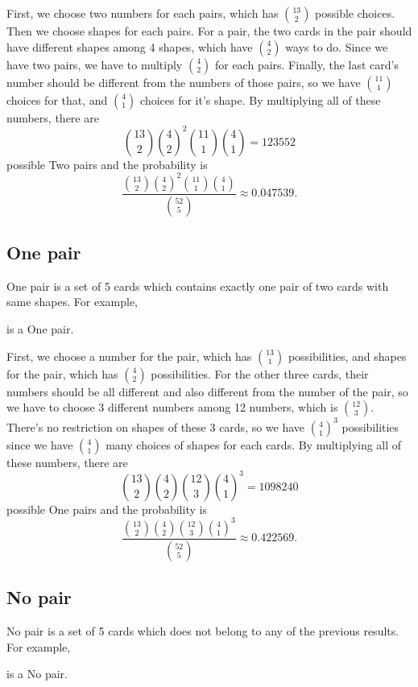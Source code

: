 \documentclass{article}
\begin{document}
First, we choose two numbers for each pairs, which has $\binom{13}{2}$ possible choices. 
Then we choose shapes for each pairs. For a pair, the two cards in the pair should have different shapes among 4 shapes, which have $\binom{4}{2}$ ways to do. Since we have two pairs, we have to multiply $\binom{4}{2}$ for each pairs. 
Finally, the last card's number should be different from the numbers of those pairs, so we have $\binom{11}{1}$ choices for that, and $\binom{4}{1}$ choices for it's shape. 
By multiplying all of these numbers, there are
$$
\binom{13}{2}\binom{4}{2}^{2}\binom{11}{1}\binom{4}{1} = 123552
$$
possible Two pairs and the probability is 
$$
\frac{\binom{13}{2}\binom{4}{2}^{2}\binom{11}{1}\binom{4}{1} }{\binom{52}{5}} \approx 0.047539. 
$$



\subsection*{One pair}
One pair is a set of 5 cards which contains exactly one pair of two cards with same shapes. 
For example, 
\begin{center}
{ \Jh{} \Jd{} \Ah{} \tres{} \fourc{} }
\end{center}
is a One pair. 

First, we choose a number for the pair, which has $\binom{13}{1}$ possibilities, and shapes for the pair, which has $\binom{4}{2}$ possibilities. 
For the other three cards, their numbers should be all different and also different from the number of the pair, so we have to choose 3 different numbers among 12 numbers, which is $\binom{12}{3}$. 
There's no restriction on shapes of these 3 cards, so we have $\binom{4}{1}^{3}$ possibilities since we have $\binom{4}{1}$ many choices of shapes for each cards. 
By multiplying all of these numbers, there are
$$
\binom{13}{2}\binom{4}{2}\binom{12}{3}\binom{4}{1}^{3} = 1098240
$$
possible One pairs and the probability is
$$
\frac{\binom{13}{2}\binom{4}{2}\binom{12}{3}\binom{4}{1}^{3}}{\binom{52}{5}} \approx 0.422569.
$$
 
\subsection*{No pair}

No pair is a set of 5 cards which does not belong to any of the previous results. For example, 
\begin{center}
{ \Ah{} \twoh{} \fourc{} \sevc{} \Js}
\end{center}
is a No pair. 
\end{document}
